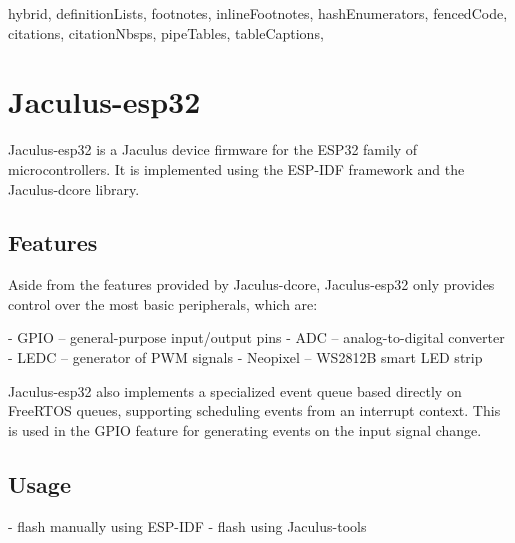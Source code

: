 \begin{markdown*}{%
  hybrid,
  definitionLists,
  footnotes,
  inlineFootnotes,
  hashEnumerators,
  fencedCode,
  citations,
  citationNbsps,
  pipeTables,
  tableCaptions,
}

\chapter{Jaculus-esp32}

Jaculus-esp32 is a Jaculus device firmware for the ESP32 family of microcontrollers. It is implemented using the ESP-IDF framework and the Jaculus-dcore library.

\section{Features}

Aside from the features provided by Jaculus-dcore, Jaculus-esp32 only provides control over the most basic peripherals, which are:

  - GPIO -- general-purpose input/output pins
  - ADC -- analog-to-digital converter
  - LEDC -- generator of PWM signals
  - Neopixel -- WS2812B smart LED strip

Jaculus-esp32 also implements a specialized event queue based directly on FreeRTOS queues, supporting scheduling events from an interrupt context. This is used in the GPIO feature for generating events on the input signal change.


\section{Usage}

  - flash manually using ESP-IDF
  - flash using Jaculus-tools


\end{markdown*}
